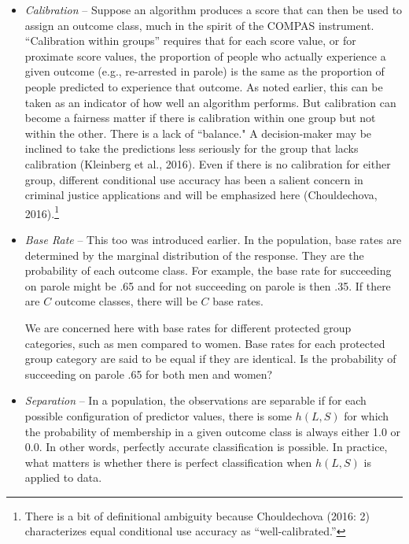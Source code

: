 \documentclass[12pt]{article}
\begin{document}
\begin{itemize}
\item
\textit{Calibration} -- Suppose an algorithm produces a score that can then be used to assign an outcome class, much in the spirit of the COMPAS instrument. ``Calibration within groups'' requires that for each score value, or for proximate score values, the proportion of people who actually experience a given outcome (e.g., re-arrested in parole) is the same as the proportion of people predicted to experience that outcome.  As noted earlier, this can be taken as an indicator of how well an algorithm performs. But calibration can become a fairness matter if there is calibration within one group but not within the other. There is a lack of ``balance." A decision-maker may be inclined to take the predictions less seriously for the group that lacks calibration (Kleinberg et al., 2016). Even if there is no calibration for either group, different conditional use accuracy has been a salient concern in criminal justice applications and will be emphasized here (Chouldechova, 2016).\footnote
{
There is a bit of definitional ambiguity because Chouldechova (2016: 2) characterizes equal conditional use accuracy as ``well-calibrated.''
}
\item
\textit{Base Rate} -- This too was introduced earlier. In the population, base rates are determined by the marginal distribution of the response. They are the probability of each outcome class. For example, the base rate for succeeding on parole might be .65 and for not succeeding on parole is then .35. If there are $C$ outcome classes, there will be $C$ base rates.

We are concerned here with base rates for different protected group categories, such as men compared to women.  Base rates for each protected group category are said to be equal if they are identical. Is the probability of succeeding on parole .65 for both men and women? 
\item
\textit{Separation} -- In a population, the observations are separable if for each possible configuration of predictor values, there is some $h(L,S)$ for which the probability of membership in a given outcome class is always either 1.0 or 0.0. In other words, perfectly accurate classification is possible. In practice, what matters is whether there is perfect classification when $h(L,S)$ is applied to data. \end{itemize}
\end{document}
